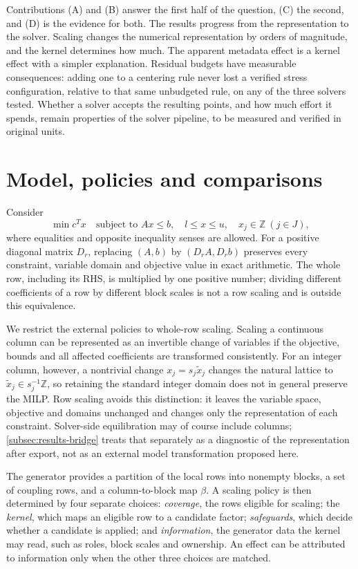 \documentclass[smallextended,envcountsect,envcountsame]{svjour3}
\begin{document}
Contributions (A) and (B) answer the first half of the question, (C) the second, and (D) is the
evidence for both. The results progress from the representation to the solver. Scaling changes the numerical
representation by orders of magnitude, and the kernel determines how much. The apparent
metadata effect is a kernel effect with a simpler explanation. Residual budgets have
measurable consequences: adding one to a centering rule never lost a verified stress
configuration, relative to that same unbudgeted rule, on any of the three solvers tested. Whether a solver accepts the resulting points, and how much
effort it spends, remain properties of the solver pipeline, to be measured and verified in
original units.



\section{Model, policies and comparisons}
\label{sec:model}
Consider
\[
 \min c^Tx\quad\text{subject to }Ax\le b,\quad l\le x\le u,\quad x_j\in\mathbb Z\ (j\in J),
\]
where equalities and opposite inequality senses are allowed. For a positive diagonal matrix
$D_r$, replacing $(A,b)$ by $(D_rA,D_rb)$ preserves every constraint, variable domain and
objective value in exact arithmetic. The whole row, including its RHS, is multiplied by one
positive number; dividing different coefficients of a row by different block scales is not a
row scaling and is outside this equivalence.

We restrict the external policies to whole-row scaling. Scaling a continuous column can be
represented as an invertible change of variables if the objective, bounds and all affected
coefficients are transformed consistently. For an integer column, however, a nontrivial change
$x_j=s_j\widetilde x_j$ changes the natural lattice to $\widetilde x_j\in s_j^{-1}\mathbb Z$, so
retaining the standard integer domain does not in general preserve the MILP. Row scaling avoids
this distinction: it leaves the variable space, objective and domains unchanged and changes only
the representation of each constraint. Solver-side equilibration may of course include columns;
\cref{subsec:results-bridge} treats that separately as a diagnostic of the representation after
export, not as an external model transformation proposed here.

The generator provides a partition of the local rows into nonempty blocks, a set of coupling
rows, and a column-to-block map $\beta$. A scaling policy is then determined by four separate
choices: \emph{coverage}, the rows eligible for scaling; the \emph{kernel}, which maps an
eligible row to a candidate factor; \emph{safeguards}, which decide whether a candidate is
applied; and \emph{information}, the generator data the kernel may read, such as roles, block
scales and ownership. An effect can be attributed to information only when the other three
choices are matched.
\end{document}
